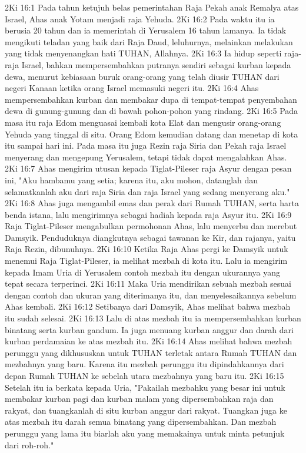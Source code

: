 2Ki 16:1  Pada tahun ketujuh belas pemerintahan Raja Pekah anak Remalya atas Israel, Ahas anak Yotam menjadi raja Yehuda.
2Ki 16:2  Pada waktu itu ia berusia 20 tahun dan ia memerintah di Yerusalem 16 tahun lamanya. Ia tidak mengikuti teladan yang baik dari Raja Daud, leluhurnya, melainkan melakukan yang tidak menyenangkan hati TUHAN, Allahnya.
2Ki 16:3  Ia hidup seperti raja-raja Israel, bahkan mempersembahkan putranya sendiri sebagai kurban kepada dewa, menurut kebiasaan buruk orang-orang yang telah diusir TUHAN dari negeri Kanaan ketika orang Israel memasuki negeri itu.
2Ki 16:4  Ahas mempersembahkan kurban dan membakar dupa di tempat-tempat penyembahan dewa di gunung-gunung dan di bawah pohon-pohon yang rindang.
2Ki 16:5  Pada masa itu raja Edom menguasai kembali kota Elat dan mengusir orang-orang Yehuda yang tinggal di situ. Orang Edom kemudian datang dan menetap di kota itu sampai hari ini. Pada masa itu juga Rezin raja Siria dan Pekah raja Israel menyerang dan mengepung Yerusalem, tetapi tidak dapat mengalahkan Ahas.
2Ki 16:7  Ahas mengirim utusan kepada Tiglat-Pileser raja Asyur dengan pesan ini, "Aku hambamu yang setia; karena itu, aku mohon, datanglah dan selamatkanlah aku dari raja Siria dan raja Israel yang sedang menyerang aku."
2Ki 16:8  Ahas juga mengambil emas dan perak dari Rumah TUHAN, serta harta benda istana, lalu mengirimnya sebagai hadiah kepada raja Asyur itu.
2Ki 16:9  Raja Tiglat-Pileser mengabulkan permohonan Ahas, lalu menyerbu dan merebut Damsyik. Penduduknya diangkutnya sebagai tawanan ke Kir, dan rajanya, yaitu Raja Rezin, dibunuhnya.
2Ki 16:10  Ketika Raja Ahas pergi ke Damsyik untuk menemui Raja Tiglat-Pileser, ia melihat mezbah di kota itu. Lalu ia mengirim kepada Imam Uria di Yerusalem contoh mezbah itu dengan ukurannya yang tepat secara terperinci.
2Ki 16:11  Maka Uria mendirikan sebuah mezbah sesuai dengan contoh dan ukuran yang diterimanya itu, dan menyelesaikannya sebelum Ahas kembali.
2Ki 16:12  Setibanya dari Damsyik, Ahas melihat bahwa mezbah itu sudah selesai.
2Ki 16:13  Lalu di atas mezbah itu ia mempersembahkan kurban binatang serta kurban gandum. Ia juga menuang kurban anggur dan darah dari kurban perdamaian ke atas mezbah itu.
2Ki 16:14  Ahas melihat bahwa mezbah perunggu yang dikhususkan untuk TUHAN terletak antara Rumah TUHAN dan mezbahnya yang baru. Karena itu mezbah perunggu itu dipindahkannya dari depan Rumah TUHAN ke sebelah utara mezbahnya yang baru itu.
2Ki 16:15  Setelah itu ia berkata kepada Uria, "Pakailah mezbahku yang besar ini untuk membakar kurban pagi dan kurban malam yang dipersembahkan raja dan rakyat, dan tuangkanlah di situ kurban anggur dari rakyat. Tuangkan juga ke atas mezbah itu darah semua binatang yang dipersembahkan. Dan mezbah perunggu yang lama itu biarlah aku yang memakainya untuk minta petunjuk dari roh-roh."
